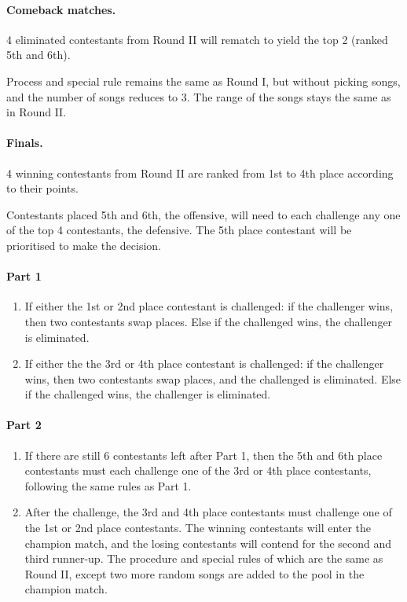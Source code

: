 \documentclass{article}
\newcommand{\srbgcolor}{red!40}
\begin{document}
\paragraph{Comeback matches.} 4 eliminated contestants
from Round II will rematch to yield the top 2
(ranked 5th and 6th).

Process and \colorbox{\srbgcolor}{special rule} remains the same as Round I,
but without picking songs,
and the number of songs reduces to 3.
The range of the songs stays the same as in Round II.

\paragraph{Finals.} 4 winning contestants from Round II
are ranked from 1st to 4th place
according to their points.

Contestants placed 5th and 6th, the offensive,
will need to each challenge any
one of the top 4 contestants, the defensive.
The 5th place contestant will be prioritised to make the decision.

\paragraph{Part 1}

\begin{enumerate}
	\item  If either the 1st or 2nd place contestant is challenged:
	      if the challenger wins,
	      then two contestants swap places.
	      Else if the challenged wins, the challenger is eliminated.

	\item  If either the the 3rd or 4th place contestant is challenged:
	      if the challenger wins,
	      then two contestants swap places,
	      and the challenged is eliminated.
	      Else if the challenged wins, the challenger is eliminated.
\end{enumerate}

\paragraph{Part 2}

\begin{enumerate}

	\item If there are still 6 contestants left after Part 1,
	      then the 5th and 6th place contestants must each challenge
	      one of the 3rd or 4th place contestants,
	      following the same rules as Part 1.

	\item After the challenge, the 3rd and 4th place contestants
	      must challenge one of the 1st or 2nd place contestants.
	      The winning contestants will enter the champion match,
	      and the losing contestants will contend for the
	      second and third runner-up.
	      The procedure and special rules of which
	      are the same as Round II,
	      except two more random songs are added
	      to the pool in the champion match.

\end{enumerate}
\end{document}

